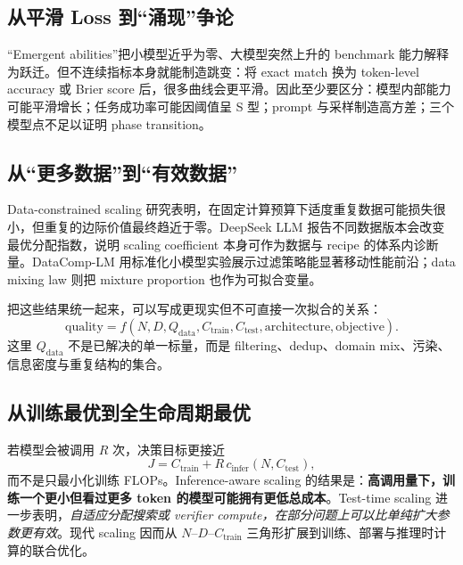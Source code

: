 \documentclass[UTF8,10pt,a4paper,fontset=none]{ctexart}
\begin{document}
\subsection{从平滑 Loss 到“涌现”争论}

“Emergent abilities”把小模型近乎为零、大模型突然上升的 benchmark 能力解释为跃迁\cite{zh:wei2022}。但不连续指标本身就能制造跳变：将 exact match 换为 token-level accuracy 或 Brier score 后，很多曲线会更平滑\cite{zh:schaeffer2023}。因此至少要区分：模型内部能力可能平滑增长；任务成功率可能因阈值呈 S 型；prompt 与采样制造高方差；三个模型点不足以证明 phase transition。

\subsection{从“更多数据”到“有效数据”}

Data-constrained scaling 研究表明，在固定计算预算下适度重复数据可能损失很小，但重复的边际价值最终趋近于零\cite{zh:muennighoff2023}。DeepSeek LLM 报告不同数据版本会改变最优分配指数，说明 scaling coefficient 本身可作为数据与 recipe 的体系内诊断量\cite{zh:deepseekllm2024}。DataComp-LM 用标准化小模型实验展示过滤策略能显著移动性能前沿\cite{zh:datacomplm2024}；data mixing law 则把 mixture proportion 也作为可拟合变量\cite{zh:datamixing2024}。

把这些结果统一起来，可以写成更现实但不可直接一次拟合的关系：
\begin{equation}
 \mathrm{quality}=f\!\left(N,D,Q_{\mathrm{data}},C_{\mathrm{train}},
 C_{\mathrm{test}},\mathrm{architecture},\mathrm{objective}\right).
 \label{zh:eq:modern-scaling}
\end{equation}
这里 $Q_{\mathrm{data}}$ 不是已解决的单一标量，而是 filtering、dedup、domain mix、污染、信息密度与重复结构的集合。

\subsection{从训练最优到全生命周期最优}

若模型会被调用 $R$ 次，决策目标更接近
\begin{equation}
  J=C_{\mathrm{train}}+R\,c_{\mathrm{infer}}(N,C_{\mathrm{test}}),
  \label{zh:eq:lifecycle}
\end{equation}
而不是只最小化训练 FLOPs。Inference-aware scaling 的结果是：\textbf{高调用量下，训练一个更小但看过更多 token 的模型可能拥有更低总成本}\cite{zh:sardana2024}。Test-time scaling 进一步表明，\textit{自适应分配搜索或 verifier compute，在部分问题上可以比单纯扩大参数更有效}\cite{zh:snell2024}。现代 scaling 因而从 $N$--$D$--$C_{\mathrm{train}}$ 三角形扩展到训练、部署与推理时计算的联合优化。
\end{document}
